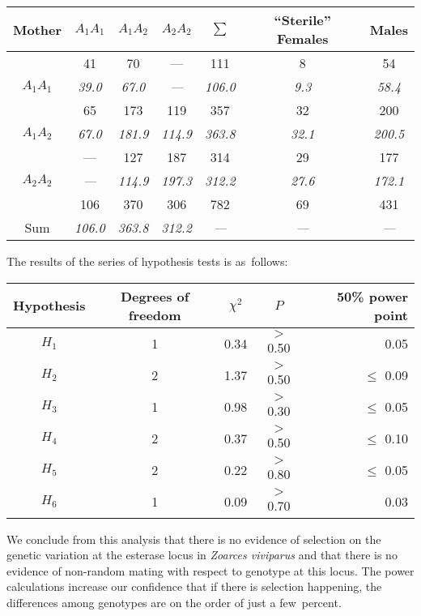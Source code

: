 \begin{center}
\begin{tabular}{c|ccc|c|cc}
Mother & $A_{1}A_{1}$ & $A_{1}A_{2}$ & $A_{2}A_{2}$ & $\sum$ & 
``Sterile'' Females & Males\\
\hline 
             & 41          & 70          & ---         & 111   
& 8          &  54\\
$A_{1}A_{1}$ & {\it 39.0}  & {\it 67.0}  & {\it ---}   & {\it 106.0} 
& {\it 9.3}  & {\it 58.4}\\
             & 65          & 173         & 119         & 357
& 32         & 200\\
$A_{1}A_{2}$ & {\it 67.0}  & {\it 181.9} & {\it 114.9} & {\it 363.8} 
& {\it 32.1} & {\it 200.5}\\
             & ---         & 127         & 187         & 314
& 29         & 177\\
$A_{2}A_{2}$ & {\it ---}   & {\it 114.9} & {\it 197.3} & {\it 312.2} 
& {\it 27.6} & {\it 172.1}\\
\hline 
             & 106         & 370         & 306         & 782
& 69         & 431\\
Sum          &  {\it 106.0} & {\it 363.8} & {\it 312.2} & {\it ---}
& {\it ---}  & {\it ---}\\
\end{tabular}
\end{center}

\noindent The results of the series of hypothesis tests is as~follows:

\begin{center}
\begin{tabular}{c|cc|c|r}
Hypothesis & Degrees of freedom & $\chi^2$ & $P$   & 50\% power point \\
\hline 
$H_1$      & 1                  & 0.34     & $>$0.50 & 0.05 \\
$H_2$      & 2                  & 1.37     & $>$0.50 & $\leq$ 0.09 \\
$H_3$      & 1                  & 0.98     & $>$0.30 & $\leq$ 0.05 \\
$H_4$      & 2                  & 0.37     & $>$0.50 & $\leq$ 0.10 \\
$H_5$      & 2                  & 0.22     & $>$0.80 & $\leq$ 0.05 \\
$H_6$      & 1                  & 0.09     & $>$0.70 & 0.03 \\
\end{tabular}
\end{center}

\medskip

We conclude from this analysis that there is no evidence of selection
on the genetic variation at the esterase locus in {\it Zoarces
viviparus\/} and that there is no evidence of non-random mating with
respect to genotype at this locus.  The power calculations increase
our confidence that if there is selection happening, the differences
among genotypes are on the order of just a few~percent.

